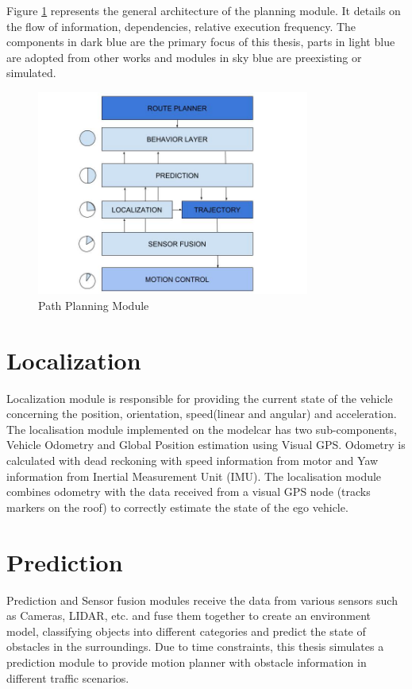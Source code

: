 Figure \ref{path_planner} represents the general architecture of the planning module. It details on the flow of information, dependencies, relative execution frequency. The components in dark blue are the primary focus of this thesis, parts in light blue are adopted from other works and modules in sky blue are preexisting or simulated. 
\begin{figure}[h]
    \centering
    \includegraphics[width=0.8\textwidth]{Images/path_planner.jpg}
    \caption{Path Planning Module}
    \label{path_planner}
\end{figure}

\section{Localization} \label{localization}

Localization module is responsible for providing the current state of the vehicle concerning the position, orientation, speed(linear and angular) and acceleration. The localisation module implemented on the modelcar has two sub-components, Vehicle Odometry and Global Position estimation using Visual GPS. Odometry is calculated with dead reckoning \cite{dead_reckoning} with speed information from motor and Yaw information from Inertial Measurement Unit (IMU). The localisation module combines odometry with the data received from a visual GPS node (tracks markers on the roof) to correctly estimate the state of the ego vehicle. 

\section{Prediction} \label{prediction}

Prediction and Sensor fusion modules receive the data from various sensors such as Cameras, LIDAR, etc. and fuse them together to create an environment model, classifying objects into different categories and predict the state of obstacles in the surroundings. Due to time constraints, this thesis simulates a prediction module to provide motion planner with obstacle information in different traffic scenarios.

